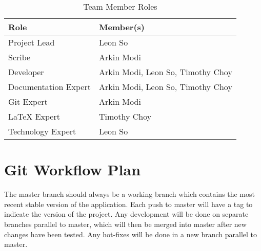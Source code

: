 \documentclass{article}
\begin{document}
\begin{table}[H]
    \centering
    \caption{Team Member Roles}
    \vspace{5pt}
    \begin{tabular}{|l|l|}
        \hline
        \textbf{Role} & \textbf{Member(s)} \\
        \hline
        Project Lead & Leon So\\
        \hline
        Scribe & Arkin Modi\\
        \hline
        Developer & Arkin Modi, Leon So, Timothy Choy \\
        \hline
        Documentation Expert & Arkin Modi, Leon So, Timothy Choy \\
        \hline
        Git Expert & Arkin Modi \\
        \hline
        LaTeX Expert & Timothy Choy \\
        \hline
        Technology Expert & Leon So \\
        \hline
    \end{tabular}
\end{table}


\section{Git Workflow Plan}
The master branch should always be a working branch which contains the most recent stable version of the application. Each push to master will have a tag to indicate the version of the project. Any development will be done on separate branches parallel to master, which will then be merged into master after new changes have been tested. Any hot-fixes will be done in a new branch parallel to master.
\end{document}
